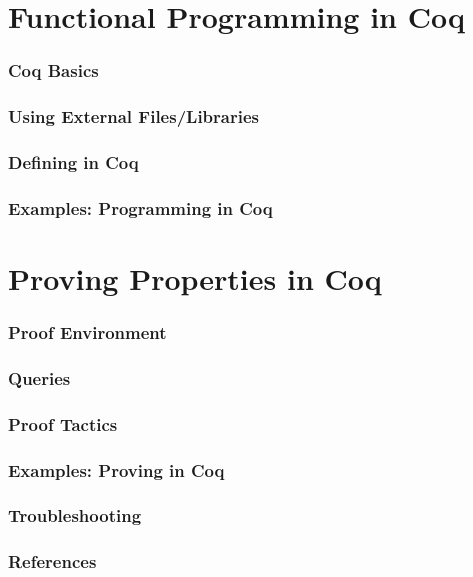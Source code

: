 \documentclass{article}
\begin{document}
\newpage
\part{Functional Programming in Coq}
	\label{Part: program}
\section{Coq Basics}
	\label{Sec: basics}
	


\newpage
\section{Using External Files/Libraries}
	\label{Sec: files}
	


\newpage
\section{Defining in Coq}
	\label{Sec: defining}
	

\newpage
\section{Examples: Programming in Coq}
	\label{Sec: program examples}
	


\newpage
\part{Proving Properties in Coq}
	\label{Part: prove}
\section{Proof Environment}
	\label{Sec: env}
	


\newpage
\section{Queries}
	\label{Sec: queries}
	


\newpage
\section{Proof Tactics}
	\label{Sec: tactics}
	


\newpage
\section{Examples: Proving in Coq}
	\label{Sec: proof examples}
	



\newpage
\section{Troubleshooting}
	\label{Sec: troubleshooting}
	



\newpage
\section{References}
	\label{Sec: refs}
	
\end{document}
